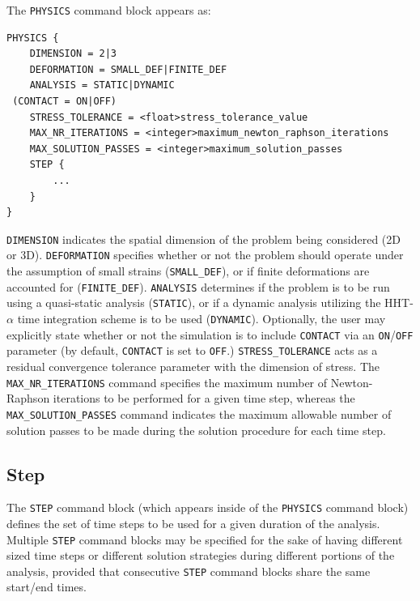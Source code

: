 \documentclass[11pt]{article} %
\begin{document}
The \texttt{PHYSICS} command block appears as:
\begin{lstlisting}
PHYSICS {
	DIMENSION = 2|3
	DEFORMATION = SMALL_DEF|FINITE_DEF
	ANALYSIS = STATIC|DYNAMIC
 (CONTACT = ON|OFF)
	STRESS_TOLERANCE = <float>stress_tolerance_value
	MAX_NR_ITERATIONS = <integer>maximum_newton_raphson_iterations
	MAX_SOLUTION_PASSES = <integer>maximum_solution_passes
	STEP {
		...
	}
}
\end{lstlisting}
\texttt{DIMENSION} indicates the spatial dimension of the problem being considered (2D or 3D). \texttt{DEFORMATION} specifies whether or not the problem should operate under the assumption of small strains (\texttt{SMALL\_DEF}), or if finite deformations are accounted for (\texttt{FINITE\_DEF}). \texttt{ANALYSIS} determines if the problem is to be run using a quasi-static analysis (\texttt{STATIC}), or if a dynamic analysis utilizing the HHT-$\alpha$ time integration scheme is to be used (\texttt{DYNAMIC}). Optionally, the user may explicitly state whether or not the simulation is to include \texttt{CONTACT} via an \texttt{ON}/\texttt{OFF} parameter (by default, \texttt{CONTACT} is set to \texttt{OFF}.) \texttt{STRESS\_TOLERANCE} acts as a residual convergence tolerance parameter with the dimension of stress. The \texttt{MAX\_NR\_ITERATIONS} command specifies the maximum number of Newton-Raphson iterations to be performed for a given time step, whereas the \texttt{MAX\_SOLUTION\_PASSES} command indicates the maximum allowable number of solution passes to be made during the solution procedure for each time step.

\subsection{Step} The \texttt{STEP} command block (which appears inside of the \texttt{PHYSICS} command block) defines the set of time steps to be used for a given duration of the analysis. Multiple \texttt{STEP} command blocks may be specified for the sake of having different sized time steps or different solution strategies during different portions of the analysis, provided that consecutive \texttt{STEP} command blocks share the same start/end times.
\end{document}
